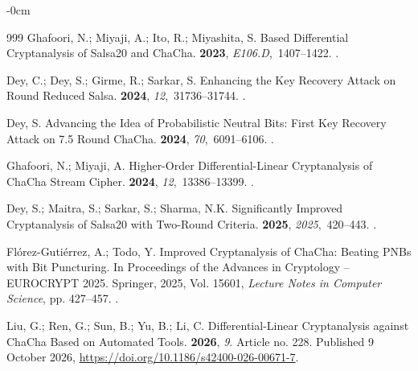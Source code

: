 \documentclass[electronics,article,submit,pdftex,oneauthor]{Definitions/mdpi}
\begin{document}
\begin{adjustwidth}{-\extralength}{0cm}
\begin{thebibliography}{999}
Ghafoori, N.; Miyaji, A.; Ito, R.; Miyashita, S.
 Based Differential Cryptanalysis of {Salsa20} and {ChaCha}.
 {\bf 2023},
  {\em E106.D},~1407--1422.
.

Dey, C.; Dey, S.; Girme, R.; Sarkar, S.
\newblock Enhancing the Key Recovery Attack on Round Reduced {Salsa}.
 {\bf 2024}, {\em 12},~31736--31744.
.

Dey, S.
\newblock Advancing the Idea of Probabilistic Neutral Bits: First Key Recovery
  Attack on 7.5 Round {ChaCha}.
 {\bf 2024}, {\em
  70},~6091--6106.
.

Ghafoori, N.; Miyaji, A.
\newblock Higher-Order Differential-Linear Cryptanalysis of {ChaCha} Stream
  Cipher.
 {\bf 2024}, {\em 12},~13386--13399.
.

Dey, S.; Maitra, S.; Sarkar, S.; Sharma, N.K.
\newblock Significantly Improved Cryptanalysis of {Salsa20} with Two-Round
  Criteria.
 {\bf 2025}, {\em
  2025},~420--443.
.

Fl{\'o}rez-Guti{\'e}rrez, A.; Todo, Y.
\newblock Improved Cryptanalysis of {ChaCha}: Beating {PNBs} with Bit
  Puncturing.
\newblock In Proceedings of the Advances in Cryptology -- {EUROCRYPT} 2025.
  Springer,  2025, Vol. 15601, {\em Lecture Notes in Computer Science}, pp.
  427--457.
.

Liu, G.; Ren, G.; Sun, B.; Yu, B.; Li, C.
\newblock Differential-Linear Cryptanalysis against {ChaCha} Based on Automated
  Tools.
 {\bf 2026}, {\em 9}.
\newblock Article no. 228. Published 9 October 2026,
  {\url{https://doi.org/10.1186/s42400-026-00671-7}}.


\end{thebibliography}
\end{adjustwidth}
\end{document}
